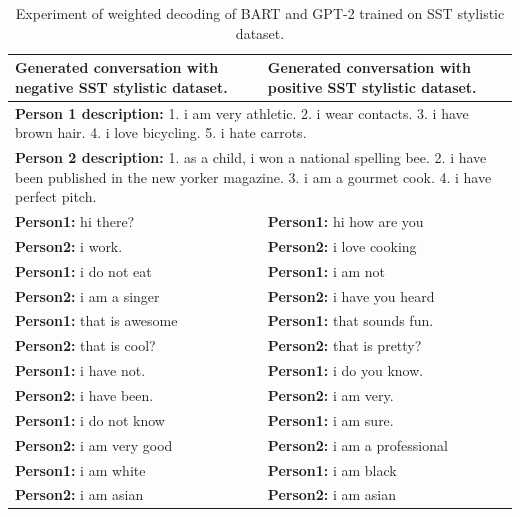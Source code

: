 \begin{table}[ht]
\centering
 \begin{tabular}{|p{7cm}|p{7cm}|} 
 \hline\hline
 \textbf{Generated conversation with negative SST stylistic dataset.} & \textbf{Generated conversation with positive SST stylistic dataset.}\\
 \hline\hline
 \multicolumn{2}{|p{14cm}|}{\textbf{Person 1 description:} 1. i am very athletic. 2. i wear contacts. 3. i have brown hair. 4. i love bicycling. 5. i hate carrots.} \\
 \hline
 \multicolumn{2}{|p{14cm}|}{\textbf{Person 2 description:} 1. as a child, i won a national spelling bee. 2. i have been published in the new yorker magazine. 3. i am a gourmet cook. 4. i have perfect pitch.} \\
 \hline\hline
 \textbf{Person1:} hi there? & \textbf{Person1:} hi how are you \\
 \textbf{Person2:} i work. &  \textbf{Person2:} i love cooking \\ 
 \textbf{Person1:} i do not eat & \textbf{Person1:} i am not \\
 \textbf{Person2:} i am a singer & \textbf{Person2:} i have you heard \\
 \textbf{Person1:} that is awesome & \textbf{Person1:} that sounds fun. \\
 \textbf{Person2:} that is cool? & \textbf{Person2:} that is pretty?  \\
 \textbf{Person1:} i have not. & \textbf{Person1:} i do you know. \\
 \textbf{Person2:} i have been. & \textbf{Person2:} i am very. \\
 \textbf{Person1:} i do not know & \textbf{Person1:} i am sure. \\
 \textbf{Person2:} i am very good & \textbf{Person2:} i am a professional \\
 \textbf{Person1:} i am white & \textbf{Person1:} i am black \\
 \textbf{Person2:} i am asian & \textbf{Person2:} i am asian \\
 \hline\hline
 \end{tabular}
 \caption{Experiment of weighted decoding of BART and GPT-2 trained on SST stylistic dataset.}
\label{tab:sst_wd}
\end{table}


